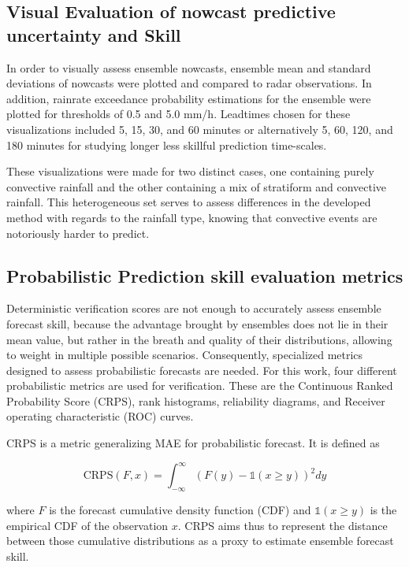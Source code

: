 
\subsection{Visual Evaluation of nowcast predictive uncertainty and Skill}

In order to visually assess ensemble nowcasts, ensemble mean and standard deviations of nowcasts were plotted and compared to radar observations. In addition, rainrate exceedance probability estimations for the ensemble were plotted for thresholds of 0.5 and 5.0 mm/h. Leadtimes chosen for these visualizations included 5, 15, 30, and 60 minutes or alternatively 5, 60, 120, and 180 minutes for studying longer less skillful prediction time-scales.

These visualizations were made for two distinct cases, one containing purely convective rainfall and the other containing a mix of stratiform and convective rainfall. This heterogeneous set serves to assess differences in the developed method with regards to the rainfall type, knowing that convective events are notoriously harder to predict.

\subsection{Probabilistic Prediction skill evaluation metrics}

\label{section:prob_metric}
Deterministic verification scores are not enough to accurately assess ensemble forecast skill, because the advantage brought by ensembles does not lie in their mean value, but rather in the breath and quality of their distributions, allowing to weight in multiple possible scenarios. Consequently, specialized metrics designed to assess probabilistic forecasts are needed. 
For this work, four different probabilistic metrics are used for verification. These are the Continuous Ranked Probability Score (CRPS), rank histograms, reliability diagrams, and Receiver operating characteristic (ROC) curves. 

CRPS is a metric generalizing MAE for probabilistic forecast. It is defined as 

\begin{equation}
	\text{CRPS}(F,x) = \int_{-\infty}^{\infty} (F(y) - \mathds{1}(x \geq y))^2 dy
\end{equation}

where $F$ is the forecast cumulative density function (CDF) and $\mathds{1}(x \geq y)$ is the empirical CDF of the observation $x$. CRPS aims thus to represent the distance between those cumulative distributions as a proxy to estimate ensemble forecast skill. 

